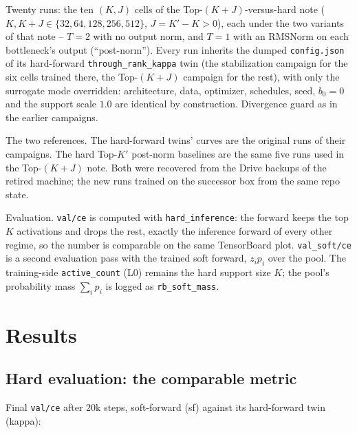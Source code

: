 \documentclass[11pt,a4paper]{article}
\newcommand{\code}[1]{\texttt{#1}}
\newcommand{\Kp}{K'}
\begin{document}
Twenty runs: the ten $(K,J)$ cells of the Top-$(K{+}J)$-versus-hard note
($K, K{+}J \in \{32,64,128,256,512\}$, $J = \Kp - K > 0$), each under the two
variants of that note -- $T=2$ with no output norm, and $T=1$ with an RMSNorm
on each bottleneck's output (``post-norm''). Every run inherits the dumped
\code{config.json} of its hard-forward \code{through\_rank\_kappa} twin (the
stabilization campaign for the six cells trained there, the Top-$(K{+}J)$
campaign for the rest), with only the surrogate mode overridden: architecture,
data, optimizer, schedules, seed, $b_0 = 0$ and the support scale $1.0$ are
identical by construction. Divergence guard as in the earlier campaigns.

The two references. The hard-forward twins' curves are the original runs of
their campaigns. The hard Top-$\Kp$ post-norm baselines are the same five runs
used in the Top-$(K{+}J)$ note. Both were recovered from the Drive backups of
the retired machine; the new runs trained on the successor box from the same
repo state.

Evaluation. \code{val/ce} is computed with \code{hard\_inference}: the
forward keeps the top $K$ activations and drops the rest, exactly the
inference forward of every other regime, so the number is comparable on the
same TensorBoard plot. \code{val\_soft/ce} is a second evaluation pass with
the trained soft forward, $z_i p_i$ over the pool. The training-side
\code{active\_count} (L0) remains the hard support size $K$; the pool's
probability mass $\sum_i p_i$ is logged as \code{rb\_soft\_mass}.

\section{Results}

\subsection*{Hard evaluation: the comparable metric}

Final \code{val/ce} after 20k steps, soft-forward (sf) against its
hard-forward twin (kappa):
\end{document}
